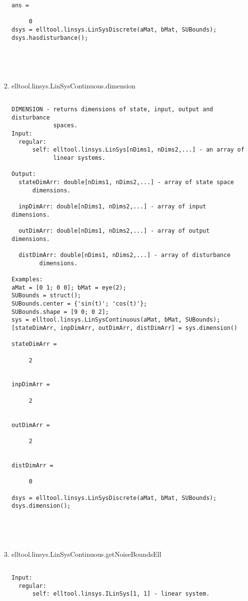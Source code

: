 \begin{enumerate}
\begin{lstlisting}
ans =

     0
dsys = elltool.linsys.LinSysDiscrete(aMat, bMat, SUBounds);
dsys.hasdisturbance();





\end{lstlisting}
\fontfamily{\familydefault}
\selectfont
\item {elltool.linsys.LinSysContinuous.dimension}
\selectfont
\begin{lstlisting}

DIMENSION - returns dimensions of state, input, output and disturbance
            spaces.
Input:
  regular:
      self: elltool.linsys.LinSys[nDims1, nDims2,...] - an array of
            linear systems.

Output:
  stateDimArr: double[nDims1, nDims2,...] - array of state space
      dimensions.

  inpDimArr: double[nDims1, nDims2,...] - array of input dimensions.

  outDimArr: double[nDims1, nDims2,...] - array of output dimensions.

  distDimArr: double[nDims1, nDims2,...] - array of disturbance
        dimensions.

Examples:
aMat = [0 1; 0 0]; bMat = eye(2);
SUBounds = struct();
SUBounds.center = {'sin(t)'; 'cos(t)'};
SUBounds.shape = [9 0; 0 2];
sys = elltool.linsys.LinSysContinuous(aMat, bMat, SUBounds);
[stateDimArr, inpDimArr, outDimArr, distDimArr] = sys.dimension()

stateDimArr =

     2


inpDimArr =

     2


outDimArr =

     2


distDimArr =

     0

dsys = elltool.linsys.LinSysDiscrete(aMat, bMat, SUBounds);
dsys.dimension();





\end{lstlisting}
\fontfamily{\familydefault}
\selectfont
\item {elltool.linsys.LinSysContinuous.getNoiseBoundsEll}
\selectfont
\begin{lstlisting}

Input:
  regular:
      self: elltool.linsys.ILinSys[1, 1] - linear system.


\end{lstlisting}
\end{enumerate}
